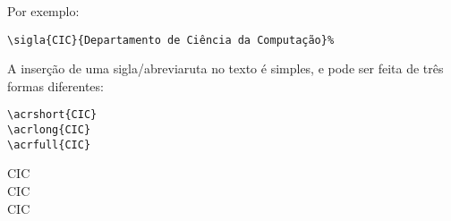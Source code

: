 Por exemplo:

\begin{verbatim}
\sigla{CIC}{Departamento de Ciência da Computação}%
\end{verbatim}

A inserção de uma sigla/abreviaruta no texto é simples, e pode ser feita de três
formas diferentes:

\begin{minipage}[t]{.3\textwidth}%
\begin{verbatim}
\acrshort{CIC}
\acrlong{CIC}
\acrfull{CIC}
\end{verbatim}
\end{minipage}%
\begin{minipage}[t]{.6\textwidth}%
\acrshort{CIC}\\
\acrlong{CIC}\\
\acrfull{CIC}
\end{minipage}%